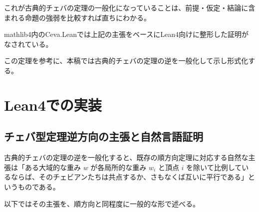 \documentclass[a4paper,12pt]{bxjsbook}
\newlength{\customindent}
\newenvironment{body}{
  \par
  \begingroup
  \setlength{\leftskip}{\customindent}
  \setlength{\rightskip}{0pt}
  \setlength{\parindent}{1em}
  \setlength{\displayindent}{\customindent}
  \setlength{\displaywidth}{\dimexpr\linewidth-\customindent\relax}
}{
  \par
  \endgroup
}
\theoremstyle{theorem}
\begin{document}
    \begin{body}
        \indent これが古典的チェバの定理の一般化になっていることは、前提・仮定・結論に含まれる命題の強弱を比較すれば直ちにわかる。

        \indent mathlib4内のCeva.Leanでは上記の主張をベースにLean4向けに整形した証明がなされている。

        \indent この定理を参考に、本稿では古典的チェバの定理の逆を一般化して示し形式化する。
    \end{body}

    \chapter{Lean4での実装}



    \section{チェバ型定理逆方向の主張と自然言語証明}
    \begin{body}
        \indent 古典的チェバの定理の逆を一般化すると、既存の順方向定理に対応する自然な主張は「ある大域的な重み $w$ が各局所的な重み $w_i$ と頂点 $i$ を除いて比例しているならば、そのチェビアンたちは共点するか、さもなくば互いに平行である」というものである。

        \indent 以下ではその主張を、順方向と同程度に一般的な形で述べる。
    \end{body}
\end{document}
